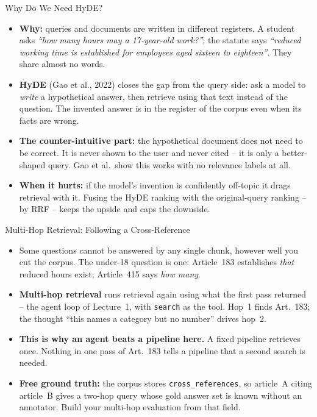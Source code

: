 \begin{frame}{Why Do We Need HyDE?}
\begin{itemize}
  \item \textbf{Why:} queries and documents are written in different registers. A student asks \emph{``how many hours may a 17-year-old work?''}; the statute says \emph{``reduced working time is established for employees aged sixteen to eighteen''}. They share almost no words.
  \pause
  \item \textbf{HyDE} (Gao et al., 2022) closes the gap from the query side: ask a model to \emph{write} a hypothetical answer, then retrieve using that text instead of the question. The invented answer is in the register of the corpus even when its facts are wrong.
  \pause
  \item \textbf{The counter-intuitive part:} the hypothetical document does not need to be correct. It is never shown to the user and never cited -- it is only a better-shaped query. Gao et al.\ show this works with no relevance labels at all.
  \pause
  \item \textbf{When it hurts:} if the model's invention is confidently off-topic it drags retrieval with it. Fusing the HyDE ranking with the original-query ranking -- by RRF -- keeps the upside and caps the downside.
\end{itemize}
\end{frame}

\begin{frame}{Multi-Hop Retrieval: Following a Cross-Reference}
\begin{itemize}
  \item Some questions cannot be answered by any single chunk, however well you cut the corpus. The under-18 question is one: Article~183 establishes \emph{that} reduced hours exist; Article~415 says \emph{how many}.
  \pause
  \item \textbf{Multi-hop retrieval} runs retrieval again using what the first pass returned -- the agent loop of Lecture~1, with \texttt{search} as the tool. Hop~1 finds Art.~183; the thought ``this names a category but no number'' drives hop~2.
  \pause
  \item \textbf{This is why an agent beats a pipeline here.} A fixed pipeline retrieves once. Nothing in one pass of Art.~183 tells a pipeline that a second search is needed.
  \pause
  \item \textbf{Free ground truth:} the corpus stores \texttt{cross\_references}, so article~A citing article~B gives a two-hop query whose gold answer set is known without an annotator. Build your multi-hop evaluation from that field.
\end{itemize}
\end{frame}

